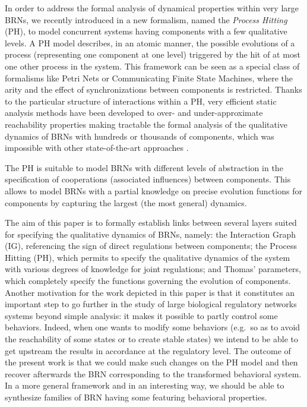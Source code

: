 In order to address the formal analysis of dynamical properties within very large BRNs, we recently
introduced in \cite{PMR10-TCSB} a new formalism, named the \emph{Process Hitting} (PH), to model
concurrent systems having components with a few qualitative levels.
A PH model describes, in an atomic manner, the possible evolutions of a process (representing one
component at one level) triggered by the hit of at most one other process in the system.
This framework can be seen as a special class of formalisms like Petri Nets or Communicating Finite
State Machines, where the arity and the effect of synchronizations between components is
restricted.
Thanks to the particular structure of interactions within a PH, very efficient static analysis
methods have been developed to over- and under-approximate reachability properties making tractable
the formal analysis of the qualitative dynamics of BRNs with hundreds or thousands of components,
which was impossible with other state-of-the-art approaches \cite{PMR12-MSCS,PAK13-CAV,FPMR13-CS2Bio}.

The PH is suitable to model BRNs with different levels of abstraction in the specification of
cooperations (associated influences) between components.
This allows to model BRNs with a partial knowledge on precise evolution functions for components
by capturing the largest (the most general) dynamics.

\medskip

The aim of this paper is to formally establish links between several layers suited for specifying the
qualitative dynamics of BRNs, namely:
the Interaction Graph (IG), referencing the sign of direct regulations between components;
the Process Hitting (PH), which permits to specify the qualitative dynamics of the system with
various degrees of knowledge for joint regulations;
and Thomas' parameters, which completely specify the functions governing the evolution of
components.
Another motivation for the work depicted in this paper is that it constitutes an important step
to go further in the study of large biological regulatory networks systems beyond simple analysis:
it makes it possible to partly control some behaviors.
Indeed, when one wants to modify some behaviors
(e.g.~so as to avoid the reachability of some states or to create stable states)
we intend to be able to get upstream the results in accordance at the regulatory level.
The outcome of the present work is that we could make such changes on the PH model
and then recover afterwards the BRN corresponding to the transformed behavioral system.
In a more general framework and in an interesting way,
we should be able to synthesize families of BRN having some featuring behavioral properties.

